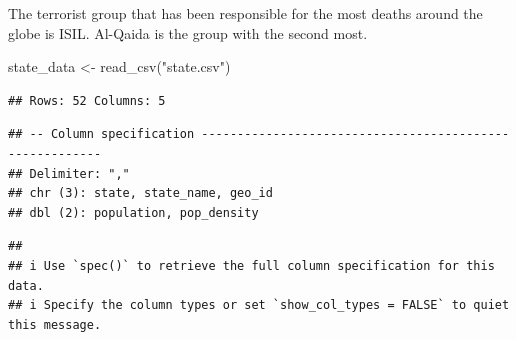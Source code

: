 \documentclass[
]{article}
\newenvironment{Shaded}{\begin{snugshade}}{\end{snugshade}}
\newcommand{\FunctionTok}[1]{\textcolor[rgb]{0.00,0.00,0.00}{#1}}
\newcommand{\NormalTok}[1]{#1}
\newcommand{\OtherTok}[1]{\textcolor[rgb]{0.56,0.35,0.01}{#1}}
\newcommand{\StringTok}[1]{\textcolor[rgb]{0.31,0.60,0.02}{#1}}
\begin{document}
The terrorist group that has been responsible for the most deaths around
the globe is ISIL. Al-Qaida is the group with the second most.

\begin{Shaded}
\begin{Highlighting}[]
\NormalTok{state\_data }\OtherTok{\textless{}{-}} \FunctionTok{read\_csv}\NormalTok{(}\StringTok{"state.csv"}\NormalTok{)}
\end{Highlighting}
\end{Shaded}

\begin{verbatim}
## Rows: 52 Columns: 5
\end{verbatim}

\begin{verbatim}
## -- Column specification --------------------------------------------------------
## Delimiter: ","
## chr (3): state, state_name, geo_id
## dbl (2): population, pop_density
\end{verbatim}

\begin{verbatim}
## 
## i Use `spec()` to retrieve the full column specification for this data.
## i Specify the column types or set `show_col_types = FALSE` to quiet this message.
\end{verbatim}
\end{document}
